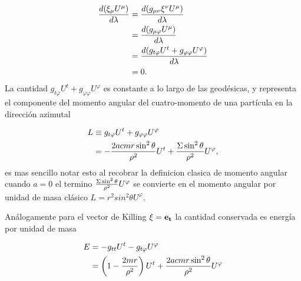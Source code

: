 \begin{align}
    \frac{d (\xi_\mu U^\mu)}{d \lambda} & = \frac{d (g_{\mu\nu} \xi^\nu U^\mu)}{d \lambda}                           \\
                                 & =\frac{d (g_{\mu\varphi}  U^\mu)}{d \lambda}                               \\
                                 & =\frac{d (g_{ t \varphi}  U^t + g_{\varphi\varphi}  U^\varphi)}{d \lambda} \\
                                 & =0 .
\end{align}
La cantidad $g_{ t \varphi}  U^t + g_{\varphi\varphi}  U^\varphi$ es constante a lo largo de las geodésicas, y representa el componente del momento angular del cuatro-momento de una partícula en la dirección azimutal

\begin{equation}
    \begin{aligned}
        L & \equiv  g_{ t \varphi}  U^t + g_{\varphi\varphi}  U^\varphi                                   \\
          & =- \frac{2a c mr \sin^2\theta}{\rho^2}   U^t + \frac{\Sigma \sin^2\theta}{\rho^2}  U^\varphi,
    \end{aligned}
\end{equation}
es mas sencillo notar esto al recobrar la definicion clasica de momento angular cuando  $a=0$ el termino  $\frac{\Sigma \sin^2\theta}{\rho^2} U^\varphi$ se convierte en el momento angular por unidad de masa clásico $L= r^2 sin^2\theta U^\varphi$.

Análogamente para el vector de Killing $\mathbf{\xi} = \mathbf{e_t}$ la cantidad conservada es energía por unidad de masa

\begin{equation}
    \begin{aligned}
        E & = -g_{ t t}  U^t - g_{t \varphi}  U^\varphi                                                     \\
          & =  \left(1-\frac{2 mr}{\rho^2}\right) U^t +    \frac{2a c mr \sin^2\theta}{\rho^2}    U^\varphi
    \end{aligned}
\end{equation}



